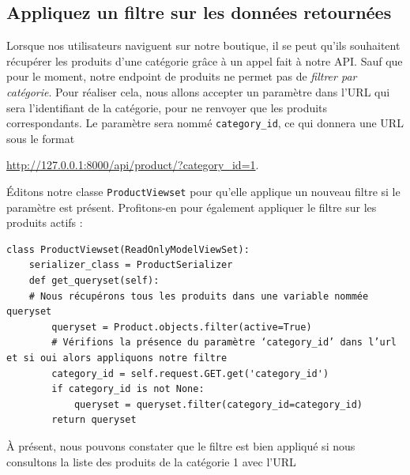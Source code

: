 \subsection{Appliquez un filtre sur les données retournées}
Lorsque nos utilisateurs naviguent sur notre boutique, il se peut qu’ils souhaitent récupérer les produits d’une catégorie grâce à un appel fait à notre API. Sauf que pour le moment, notre endpoint de produits ne permet pas de {\em filtrer par catégorie}. Pour réaliser cela, nous allons accepter un paramètre dans l’URL qui sera l’identifiant de la catégorie, pour ne renvoyer que les produits correspondants. Le paramètre sera nommé {\tt category\_id}, ce qui donnera une URL sous le format
\begin{center}
\url{http://127.0.0.1:8000/api/product/?category_id=1}.
\end{center}
Éditons notre classe {\tt ProductViewset}  pour qu’elle applique un nouveau filtre si le paramètre est présent. Profitons-en pour également appliquer le filtre sur les produits actifs :
\begin{verbatim}
class ProductViewset(ReadOnlyModelViewSet):
    serializer_class = ProductSerializer
    def get_queryset(self):
    # Nous récupérons tous les produits dans une variable nommée queryset
        queryset = Product.objects.filter(active=True)
        # Vérifions la présence du paramètre ‘category_id’ dans l’url et si oui alors appliquons notre filtre
        category_id = self.request.GET.get('category_id')
        if category_id is not None:
            queryset = queryset.filter(category_id=category_id)
        return queryset
\end{verbatim}

À présent, nous pouvons constater que le filtre est bien appliqué si nous consultons la liste des produits de la catégorie 1 avec l’URL 

